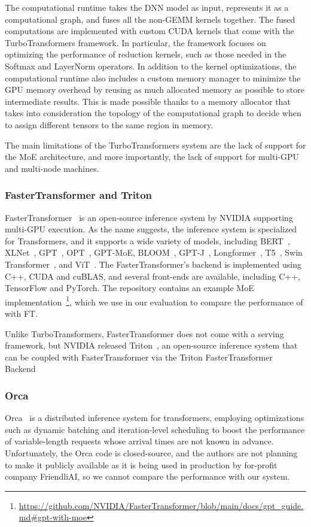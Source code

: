 The computational runtime takes the DNN model as input, represents it as a computational graph, and fuses all the non-GEMM kernels together. The fused computations are implemented with custom CUDA kernels that come with the TurboTransformers framework. In particular, the framework focuses on optimizing the performance of reduction kernels, such as those needed in the Softmax and LayerNorm operators. In addition to the kernel optimizations, the computational runtime also includes a custom memory manager to minimize the GPU memory overhead by reusing as much allocated memory as possible to store intermediate results. This is made possible thanks to a memory allocator that takes into consideration the topology of the computational graph to decide when to assign different tensors to the same region in memory.

The main limitations of the TurboTransformers system are the lack of support for the MoE architecture, and more importantly, the lack of support for multi-GPU and multi-node machines.


\subsubsection{FasterTransformer and Triton}
FasterTransformer~\cite{faster_transformer} is an open-source inference system by NVIDIA supporting multi-GPU execution. As the name suggests, the inference system is specialized for Transformers, and it supports a wide variety of models, including BERT~\cite{bert}, XLNet~\cite{xlnet}, GPT~\cite{gpt1, gpt2, brown_2020}, OPT~\cite{opt}, GPT-MoE, BLOOM~\cite{bloom}, GPT-J~\cite{gpt-j}, Longformer~\cite{longformer}, T5~\cite{t5}, Swin Transformer~\cite{swin-transformer}, and ViT~\cite{vit}. The FasterTransformer's backend is implemented using C++, CUDA and cuBLAS, and several front-ends are available, including C++, TensorFlow and PyTorch. The repository contains an example MoE implementation~\footnote{\url{https://github.com/NVIDIA/FasterTransformer/blob/main/docs/gpt\_guide.md\#gpt-with-moe}}, which we use in our evaluation to compare the performance of \Project with FT. 

Unlike TurboTransformers, FasterTransformer does not come with a serving framework, but NVIDIA released Triton~\cite{triton}, an open-source inference system that can be coupled with FasterTransformer via the Triton FasterTransformer Backend~\cite{triton-ft-backend}

\subsubsection{Orca}
Orca~\cite{orca} is a distributed inference system for transformers, employing optimizations such as dynamic batching and iteration-level scheduling to boost the performance of variable-length requests whose arrival times are not known in advance. Unfortunately, the Orca code is closed-source, and the authors are not planning to make it publicly available as it is being used in production by for-profit company FriendliAI, so we cannot compare the performance with our system. 

